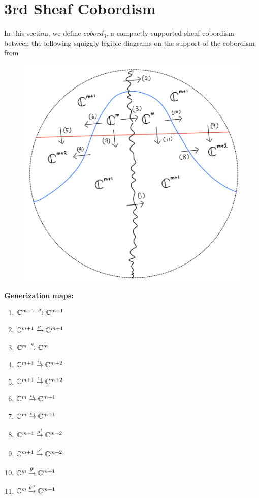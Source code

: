 \section{3rd Sheaf Cobordism}
In this section, we define $cobord_3$, a compactly supported sheaf 	cobordism between the following squiggly legible diagrams on the support of the cobordism from
\begin{figure}[H]
    \centering
    \includegraphics[scale = 0.45]{diagrams/lemma3/21.png} 
    \caption{}
    \label{fig:your-label}
\end{figure}
\textbf{Generization maps:}
\begin{enumerate}[label = (\arabic*)]
\item $\mathbb{C}^{m+1} \xrightarrow{\mu} \mathbb{C}^{m+1}$

\item $\mathbb{C}^{m+1} \xrightarrow{\nu} \mathbb{C}^{m+1}$

\item $\mathbb{C}^{m} \xrightarrow{\theta} \mathbb{C}^{m}$

\item $\mathbb{C}^{m+1} \overset{\iota_1}{\rightarrow} \mathbb{C}^{m+2}$

\item $\mathbb{C}^{m+1} \overset{\iota_0}{\rightarrow} \mathbb{C}^{m+2}$

\item $\mathbb{C}^{m} \overset{\iota_1}{\rightarrow} \mathbb{C}^{m+1}$

\item $\mathbb{C}^{m} \overset{\iota_0}{\rightarrow} \mathbb{C}^{m+1}$

\item $\mathbb{C}^{m+1} \overset{\mu'}{\rightarrow} \mathbb{C}^{m+2}$

\item $\mathbb{C}^{m+1} \overset{\nu'}{\rightarrow} \mathbb{C}^{m+2}$

\item $\mathbb{C}^{m} \overset{\theta'}{\rightarrow} \mathbb{C}^{m+1}$

\item $\mathbb{C}^{m} \overset{\theta''}{\rightarrow} \mathbb{C}^{m+1}$
\end{enumerate}

